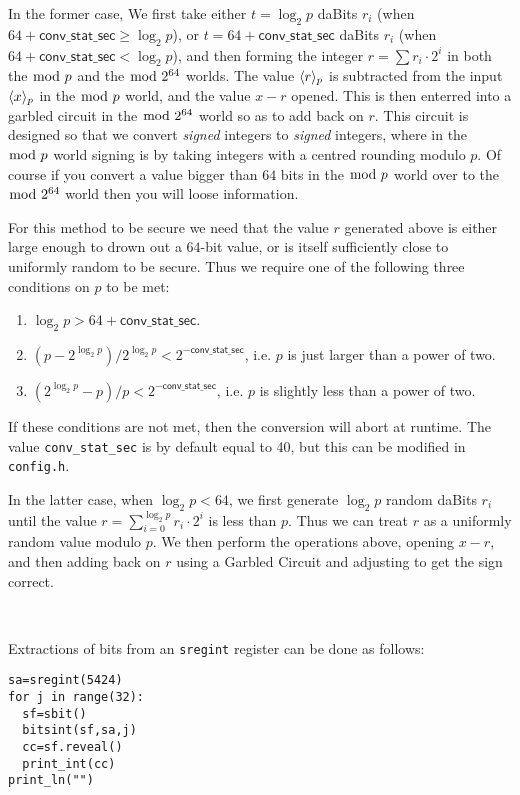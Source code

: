 In the former case, We first take either $t=\log_2 p$ daBits $r_i$ 
(when $64+\mathsf{conv\_stat\_sec} \ge \log_2 p$),
or $t=64+\mathsf{conv\_stat\_sec}$ daBits $r_i$ 
(when $64+\mathsf{conv\_stat\_sec}<\log_2 p$),
and then forming the integer $r = \sum r_i \cdot 2^i$
in both the $\bmod \; p$ and the $\bmod \; 2^{64}$ worlds. 
The value $\langle r \rangle_p$ is subtracted from the input $\langle x \rangle_p$ in 
the $\bmod \; p$ world, and the value $x-r$ opened. 
This is then enterred into a garbled circuit in the $\bmod \; 2^{64}$ world so as to add back on $r$. 
This circuit is designed so that we convert {\it signed}  integers to {\it signed}
integers, where in the $\bmod \; p$ world signing is by taking integers with a centred 
rounding modulo $p$.
Of course if you convert a value bigger than $64$ bits in the $\bmod \; p$ world over to the $\bmod \; 2^{64}$
world then you will loose information.

For this method to be secure we need that the value $r$ generated above is 
either large enough to drown out a $64$-bit value, or is itself sufficiently close 
to uniformly random to be secure.
Thus we require one of the following three conditions on $p$ to be met:
\begin{enumerate}
\item $\log_2 p > 64+ \mathsf{conv\_stat\_sec}$.
\item $(p - 2^{\log_2 p}) / 2^{\log_2 p} < 2^{-\mathsf{conv\_stat\_sec}}$, i.e. $p$ is just larger than a power of two.
\item $(2^{\log_2 p}-p) / p < 2^{-\mathsf{conv\_stat\_sec}}$, i.e. $p$ is slightly less than a power of two.
\end{enumerate}
If these conditions are not met, then the conversion will abort at runtime.
The value \verb|conv_stat_sec| is by default equal to 40, but this can be modified in
\verb|config.h|.

In the latter case, when $\log_2 p < 64$, we first generate $\log_2 p$ random daBits
$r_i$ until the value $r = \sum_{i=0}^{\log_2 p} r_i \cdot 2^i$ is less than $p$.
Thus we can treat $r$ as a uniformly random value modulo $p$.
We then perform the operations above, opening $x-r$, and then adding back on $r$
using a Garbled Circuit and adjusting to get the sign correct.

~

\noindent
Extractions of bits from an \verb|sregint| register can be done as follows:
\begin{lstlisting}
sa=sregint(5424)
for j in range(32):
  sf=sbit()
  bitsint(sf,sa,j)
  cc=sf.reveal()
  print_int(cc)
print_ln("")
\end{lstlisting}


